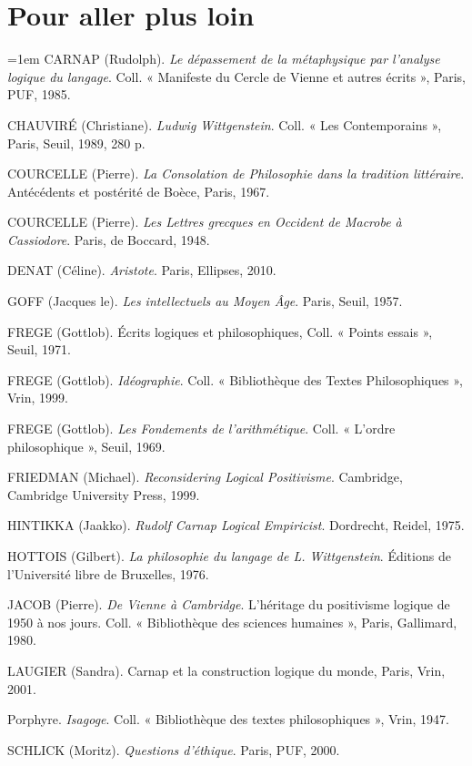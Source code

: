 \section*{Pour aller plus loin}
{}
\begingroup\small\setlength{\parindent}{-1em}\leftskip=1em
CARNAP (Rudolph). \textit{Le dépassement de la métaphysique par l’analyse logique du langage}. Coll. « Manifeste du Cercle de Vienne et autres écrits », Paris, PUF, 1985.

CHAUVIRÉ (Christiane). \textit{Ludwig Wittgenstein}. Coll. « Les Contemporains », Paris, Seuil, 1989, 280 p.

COURCELLE (Pierre). \textit{La Consolation de Philosophie dans la tradition littéraire}. Antécédents et postérité de Boèce, Paris, 1967.

COURCELLE (Pierre). \textit{Les Lettres grecques en Occident de Macrobe à Cassiodore}. Paris, de Boccard, 1948.

DENAT (Céline). \textit{Aristote}. Paris, Ellipses, 2010.

GOFF (Jacques le). \textit{Les intellectuels au Moyen Âge}. Paris, Seuil, 1957.

FREGE (Gottlob). Écrits logiques et philosophiques, Coll. « Points essais », Seuil, 1971.

FREGE (Gottlob). \textit{Idéographie}. Coll. « Bibliothèque des Textes Philosophiques », Vrin, 1999.

FREGE (Gottlob). \textit{Les Fondements de l’arithmétique}. Coll. « L’ordre philosophique », Seuil, 1969.

FRIEDMAN (Michael). \textit{Reconsidering Logical Positivisme}. Cambridge, Cambridge University Press, 1999.

HINTIKKA (Jaakko). \textit{Rudolf Carnap Logical Empiricist}. Dordrecht, Reidel, 1975.

HOTTOIS (Gilbert). \textit{La philosophie du langage de L. Wittgenstein}. Éditions de l’Université libre de Bruxelles, 1976.

JACOB (Pierre). \textit{De Vienne à Cambridge}. L’héritage du positivisme logique de 1950 à nos jours. Coll. « Bibliothèque des sciences humaines », Paris, Gallimard, 1980.

LAUGIER (Sandra). Carnap et la construction logique du monde, Paris, Vrin, 2001.

Porphyre. \textit{Isagoge}. Coll. « Bibliothèque des textes philosophiques », Vrin, 1947.

SCHLICK (Moritz). \textit{Questions d’éthique}. Paris, PUF, 2000.

